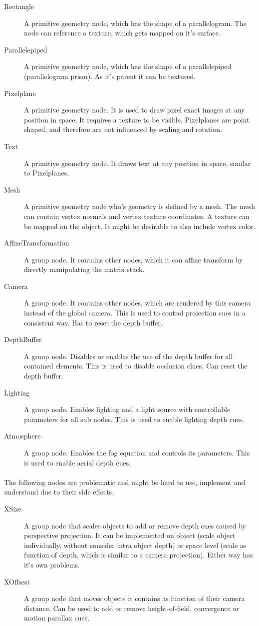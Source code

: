 \begin{description}
\item[Rectangle] A primitive geometry node, which has the shape of a parallelogram. The node can reference a texture, which gets mapped on it's surface.
\item[Parallelepiped] A primitive geometry node, which has the shape of a parallelepiped (parallelogram prism). As it's parent it can be textured.
\item[Pixelplane] A primitive geometry node. It is used to draw pixel exact images at any position in space. It requires a texture to be visible. Pixelplanes are point shaped, and therefore are not influenced by scaling and rotation.
\item[Text] A primitive geometry node. It draws text at any position in space, similar to Pixelplanes.
\item[Mesh] A primitive geometry node who's geometry is defined by a mesh. The mesh can contain vertex normals and vertex texture coordinates. A texture can be mapped on the object. It might be desirable to also include vertex color.
\item[AffineTransformation] A group  node. It contains other nodes, which it can affine transform by directly manipulating the matrix stack.
\item[Camera] A group node. It contains other nodes, which are rendered by this camera instead of the global camera. This is used to control projection cues in a consistent way. Has to reset the depth buffer.
\item[DepthBuffer] A group node. Disables or enables the use of the depth buffer for all contained elements. This is used to disable occlusion clues. Can reset the depth buffer.
\item[Lighting] A group node. Enables lighting and a light source with controllable parameters for all sub nodes. This is used to enable lighting depth cues.
\item[Atmosphere] A group node. Enables the fog equation and controls its parameters. This is used to enable aerial depth cues.
\end{description}

\paragraph{}
The following nodes are problematic and might be hard to use, implement and understand due to their side effects.

\begin{description}
\item[XSize] A group node that scales objects to add or remove depth cues caused by perspective projection. It can be implemented on object (scale object individually, without consider intra object depth) or space level (scale  as function of depth, which is similar to a camera projection). Either way has it's own problems.
\item[XOffsest] A group node that moves objects it contains as function of their camera distance. Can be used to add or remove height-of-field, convergence or motion parallax cues.
\end{description}

